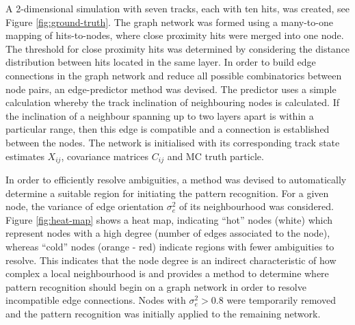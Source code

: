 

A 2-dimensional simulation with seven tracks, each with ten hits, was created, see Figure \ref{fig:ground-truth}. The graph network was formed using a many-to-one mapping of hits-to-nodes, where close proximity hits were merged into one node. The threshold for close proximity hits was determined by considering the distance distribution between hits located in the same layer. In order to build edge connections in the graph network and reduce all possible combinatorics between node pairs, an edge-predictor method was devised. The predictor uses a simple calculation whereby the track inclination of neighbouring nodes is calculated. If the inclination of a neighbour spanning up to two layers apart is within a particular range, then this edge is compatible and a connection is established between the nodes. The network is initialised with its corresponding track state estimates $X_{ij}$, covariance matrices $C_{ij}$ and MC truth particle.

In order to efficiently resolve ambiguities, a method was devised to automatically determine a suitable region for initiating the pattern recognition. For a given node, the variance of edge orientation $\sigma_e^2$ of its neighbourhood was considered. Figure \ref{fig:heat-map} shows a heat map, indicating ``hot'' nodes (white) which represent nodes with a high degree (number of edges associated to the node), whereas ``cold'' nodes (orange - red) indicate regions with fewer ambiguities to resolve. This indicates that the node degree is an indirect characteristic of how complex a local neighbourhood is and provides a method to determine where pattern recognition should begin on a graph network in order to resolve incompatible edge connections. Nodes with $\sigma_e^2 > 0.8$ were temporarily removed and the pattern recognition was initially applied to the remaining network.

